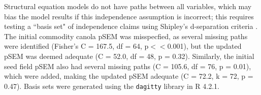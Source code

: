 \documentclass[12pt]{article} %
\begin{document}
Structural equation models do not have paths between all variables, which may bias the model results if this independence assumption is incorrect; this requires testing a ``basis set" of independence claims using Shipley's d-separation criteria \citep{shipley2000, shipley2009}.
The initial commodity canola pSEM was misspecfied, as several missing paths were identified (Fisher's C = 167.5, df = 64, p$<<$0.001), but the updated pSEM was deemed adequate (C = 52.0, df = 48, p = 0.32).
Similarly, the initial seed field pSEM also had several missing paths (C = 105.6, df = 76, p = 0.01), which were added, making the updated pSEM adequate (C = 72.2, k = 72, p = 0.47).
Basis sets were generated using the \texttt{dagitty} library in R 4.2.1.


\end{document}
